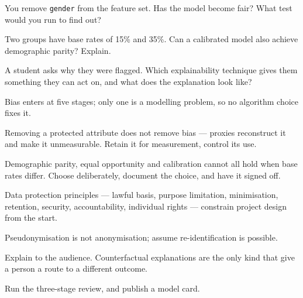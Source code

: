 \begin{checkpoint}
\begin{tightnum}
  \item You remove \texttt{gender} from the feature set. Has the model become fair?
        What test would you run to find out?
  \item Two groups have base rates of 15\% and 35\%. Can a calibrated model also
        achieve demographic parity? Explain.
  \item A student asks why they were flagged. Which explainability technique gives
        them something they can act on, and what does the explanation look like?
\end{tightnum}
\end{checkpoint}

\begin{chaptersummary}
\begin{tight}
  \item Bias enters at five stages; only one is a modelling problem, so no algorithm
        choice fixes it.
  \item Removing a protected attribute does not remove bias --- proxies reconstruct
        it and make it unmeasurable. Retain it for measurement, control its use.
  \item Demographic parity, equal opportunity and calibration cannot all hold when
        base rates differ. Choose deliberately, document the choice, and have it
        signed off.
  \item Data protection principles --- lawful basis, purpose limitation,
        minimisation, retention, security, accountability, individual rights ---
        constrain project design from the start.
  \item Pseudonymisation is not anonymisation; assume re-identification is possible.
  \item Explain to the audience. Counterfactual explanations are the only kind that
        give a person a route to a different outcome.
  \item Run the three-stage review, and publish a model card.
\end{tight}
\end{chaptersummary}

